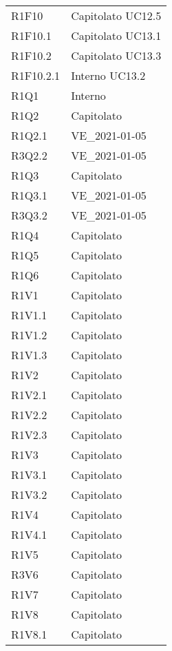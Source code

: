 {\begin{longtable}{C{3cm} C{12.5cm}}

R1F10 & Capitolato \quad UC12.5\\
R1F10.1 & Capitolato \quad UC13.1\\
R1F10.2 & Capitolato \quad UC13.3\\
R1F10.2.1 & Interno \quad UC13.2 \\


R1Q1 & Interno \\
R1Q2 & Capitolato \\
R1Q2.1 & VE\_2021-01-05 \\
R3Q2.2 & VE\_2021-01-05 \\
R1Q3 & Capitolato \\
R1Q3.1 & VE\_2021-01-05 \\
R3Q3.2 & VE\_2021-01-05 \\
R1Q4 & Capitolato \\
R1Q5 & Capitolato \\
R1Q6 & Capitolato \\


R1V1 & Capitolato \\
R1V1.1 & Capitolato \\
R1V1.2 & Capitolato \\
R1V1.3 & Capitolato \\


R1V2 & Capitolato \\
R1V2.1 & Capitolato \\
R1V2.2 & Capitolato \\
R1V2.3 & Capitolato \\


R1V3 & Capitolato \\
R1V3.1 & Capitolato \\
R1V3.2 & Capitolato \\

R1V4 & Capitolato \\
R1V4.1 & Capitolato \\

R1V5 & Capitolato \\

R3V6 & Capitolato \\

R1V7 & Capitolato \\

R1V8 & Capitolato \\
R1V8.1 & Capitolato \\


\end{longtable}}
